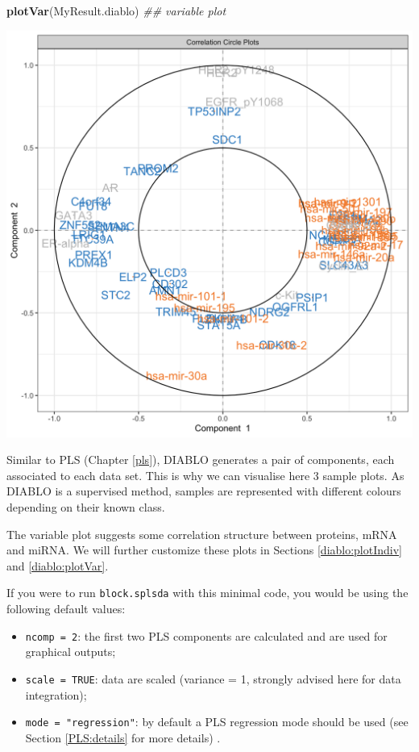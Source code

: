 \documentclass[]{book}
\newenvironment{Shaded}{\begin{snugshade}}{\end{snugshade}}
\newcommand{\CommentTok}[1]{\textcolor[rgb]{0.56,0.35,0.01}{\textit{#1}}}
\newcommand{\KeywordTok}[1]{\textcolor[rgb]{0.13,0.29,0.53}{\textbf{#1}}}
\newcommand{\NormalTok}[1]{#1}
\providecommand{\tightlist}{%
  \setlength{\itemsep}{0pt}\setlength{\parskip}{0pt}}
\begin{document}
\begin{Shaded}
\begin{Highlighting}[]
\KeywordTok{plotVar}\NormalTok{(MyResult.diablo) }\CommentTok{## variable plot}
\end{Highlighting}
\end{Shaded}

\begin{center}\includegraphics[width=0.75\linewidth,]{Figures/06-diablo-sparse-2} \end{center}

Similar to PLS (Chapter \ref{pls}), DIABLO generates a pair of components, each associated to each data set. This is why we can visualise here 3 sample plots. As DIABLO is a supervised method, samples are represented with different colours depending on their known class.

The variable plot suggests some correlation structure between proteins, mRNA and miRNA. We will further customize these plots in Sections \ref{diablo:plotIndiv} and \ref{diablo:plotVar}.

If you were to run \texttt{block.splsda} with this minimal code, you would be using the following default values:

\begin{itemize}
\tightlist
\item
  \texttt{ncomp\ =\ 2}: the first two PLS components are calculated and are used for graphical outputs;
\item
  \texttt{scale\ =\ TRUE}: data are scaled (variance = 1, strongly advised here for data integration);
\item
  \texttt{mode\ =\ "regression"}: by default a PLS regression mode should be used (see Section \ref{PLS:details} for more details) .
\end{itemize}
\end{document}
